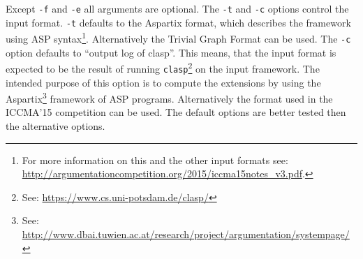 \documentclass{scrartcl}
\begin{document}
Except \texttt{-f} and \texttt{-e} all arguments are optional.  The \texttt{-t}
and \texttt{-c} options control the input format. \texttt{-t} defaults to the
Aspartix format, which describes the framework using ASP syntax\footnote{For
    more information on this and the other input formats see:
\url{http://argumentationcompetition.org/2015/iccma15notes_v3.pdf}.}.
Alternatively the Trivial Graph Format can be used. The \texttt{-c} option
defaults to ``output log of clasp''. This means, that the input format is
expected to be the result of running \texttt{clasp}\footnote{See:
\url{https://www.cs.uni-potsdam.de/clasp/}} on the input framework. The intended
purpose of this option is to compute the extensions by using the
Aspartix\footnote{See:
\url{http://www.dbai.tuwien.ac.at/research/project/argumentation/systempage/}}
framework of ASP programs. Alternatively the format used in the ICCMA'15
competition can be used. The default options are better tested then the
alternative options.
\end{document}
